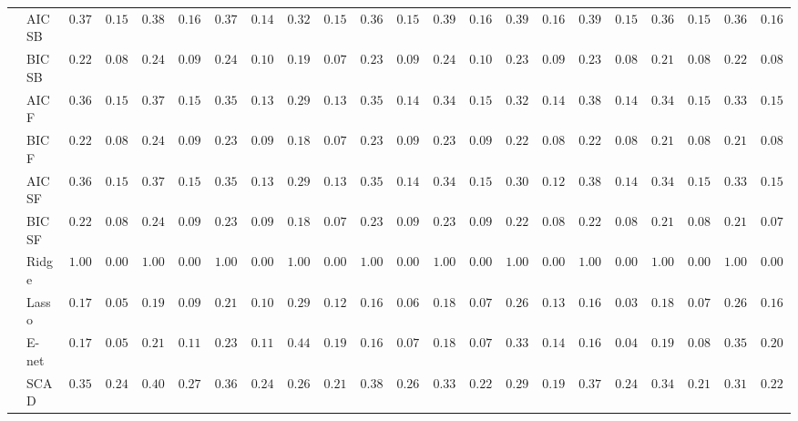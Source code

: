 \begin{tabular}{ll|ll|llllll|llllll|llllll}
 & AIC SB  & $0.3733$ & $0.1573$ & $0.3850$ & $0.1636$ & $0.3767$ & $0.1491$ & $0.3200$ & $0.1548$ & $0.3667$ & $0.1535$ & $0.3917$ & $0.1648$ & $0.3983$ & $0.1690$ & $0.3933$ & $0.1508$ & $0.3683$ & $0.1559$ & $0.3683$ & $0.1646$ \\
 & BIC SB  & $0.2250$ & $0.0898$ & $0.2400$ & $0.0927$ & $0.2400$ & $0.1041$ & $0.1967$ & $0.0763$ & $0.2383$ & $0.0984$ & $0.2400$ & $0.1014$ & $0.2333$ & $0.0948$ & $0.2300$ & $0.0879$ & $0.2133$ & $0.0857$ & $0.2250$ & $0.0866$ \\
 & AIC F  & $0.3633$ & $0.1560$ & $0.3767$ & $0.1565$ & $0.3550$ & $0.1374$ & $0.2933$ & $0.1384$ & $0.3583$ & $0.1486$ & $0.3467$ & $0.1529$ & $0.3233$ & $0.1476$ & $0.3883$ & $0.1499$ & $0.3450$ & $0.1522$ & $0.3333$ & $0.1517$ \\
 & BIC F  & $0.2217$ & $0.0856$ & $0.2417$ & $0.0929$ & $0.2333$ & $0.0977$ & $0.1867$ & $0.0722$ & $0.2367$ & $0.0953$ & $0.2333$ & $0.0977$ & $0.2267$ & $0.0871$ & $0.2233$ & $0.0828$ & $0.2100$ & $0.0808$ & $0.2167$ & $0.0803$ \\
 & AIC SF  & $0.3633$ & $0.1560$ & $0.3767$ & $0.1565$ & $0.3550$ & $0.1374$ & $0.2933$ & $0.1384$ & $0.3583$ & $0.1486$ & $0.3450$ & $0.1522$ & $0.3083$ & $0.1284$ & $0.3867$ & $0.1458$ & $0.3450$ & $0.1522$ & $0.3333$ & $0.1517$ \\
 & BIC SF  & $0.2217$ & $0.0856$ & $0.2417$ & $0.0929$ & $0.2333$ & $0.0977$ & $0.1867$ & $0.0722$ & $0.2367$ & $0.0953$ & $0.2317$ & $0.0974$ & $0.2267$ & $0.0871$ & $0.2233$ & $0.0828$ & $0.2100$ & $0.0808$ & $0.2150$ & $0.0796$ \\
 & Ridge  & $1.0000$ & $0.0000$ & $1.0000$ & $0.0000$ & $1.0000$ & $0.0000$ & $1.0000$ & $0.0000$ & $1.0000$ & $0.0000$ & $1.0000$ & $0.0000$ & $1.0000$ & $0.0000$ & $1.0000$ & $0.0000$ & $1.0000$ & $0.0000$ & $1.0000$ & $0.0000$ \\
 & Lasso  & $0.1733$ & $0.0576$ & $0.1917$ & $0.0929$ & $0.2167$ & $0.1019$ & $0.2917$ & $0.1239$ & $0.1633$ & $0.0669$ & $0.1850$ & $0.0745$ & $0.2667$ & $0.1319$ & $0.1650$ & $0.0374$ & $0.1883$ & $0.0773$ & $0.2683$ & $0.1673$ \\
 & E-net  & $0.1733$ & $0.0576$ & $0.2117$ & $0.1132$ & $0.2383$ & $0.1118$ & $0.4483$ & $0.1905$ & $0.1683$ & $0.0730$ & $0.1850$ & $0.0745$ & $0.3333$ & $0.1460$ & $0.1667$ & $0.0474$ & $0.1967$ & $0.0898$ & $0.3500$ & $0.2017$ \\
 & SCAD  & $0.3583$ & $0.2466$ & $0.4067$ & $0.2715$ & $0.3667$ & $0.2496$ & $0.2683$ & $0.2144$ & $0.3817$ & $0.2641$ & $0.3383$ & $0.2215$ & $0.2900$ & $0.1962$ & $0.3717$ & $0.2437$ & $0.3433$ & $0.2195$ & $0.3183$ & $0.2273$ \\

\end{tabular}
